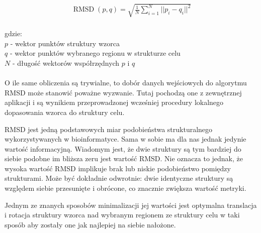 \documentclass[licencjacka]{pracamgr}
\DeclareMathOperator{\rmsd}{RMSD}
\begin{document}
$$
\begin{array}{lr}
\rmsd(p,q) = \sqrt{\frac{1}{N}\sum_{i=1}^{N}||p_i-q_i||^{2}}
\end{array}
$$
\\
gdzie:
\\
$p$ - wektor punktów struktury wzorca
\\
$q$ - wektor punktów wybranego regionu w strukturze celu
\\
$N$ - długość wektorów współrzędnych $p$ i $q$
\\
\\
O ile same obliczenia są trywialne, to dobór danych wejściowych do algorytmu RMSD może stanowić poważne wyzwanie. Tutaj pochodzą one z zewnętrznej aplikacji i są wynikiem przeprowadzonej wcześniej procedury lokalnego dopasowania wzorca do struktury celu.

RMSD jest jedną podstawowych miar podobieństwa strukturalnego wykorzystywanych w bioinformatyce. Sama w sobie ma dla nas jednak jedynie wartość informacyjną. Wiadomym jest, że dwie struktury są tym bardziej do siebie podobne im bliższa zeru jest wartość RMSD. Nie oznacza to jednak, że wysoka wartość RMSD implikuje brak lub niskie podobieństwo pomiędzy strukturami. Może być dokładnie odwrotnie: dwie identyczne struktury są względem siebie przesunięte i obrócone, co znacznie zwiększa wartość metryki.

Jednym ze znanych sposobów minimalizacji jej wartości jest optymalna translacja i rotacja struktury wzorca nad wybranym regionem ze struktury celu w taki sposób aby zostały one jak najlepiej na siebie nałożone.
\end{document}
